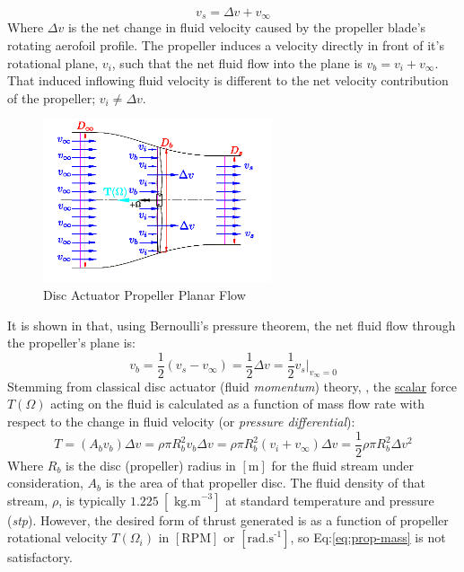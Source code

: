 \begin{equation}
v_s = \Delta v + v_\infty
\end{equation}
Where $\Delta v$ is the net change in fluid velocity caused by the propeller blade's rotating aerofoil profile. The propeller induces a velocity directly in front of it's rotational plane, $v_i$, such that the net fluid flow into the plane is $v_b=v_i+v_\infty$. That induced inflowing fluid velocity is different to the net velocity contribution of the propeller; $v_i\not=\Delta v$.
\par
\begin{figure}[htbp]
\centering
\includegraphics[width=0.6\textwidth]{figs/bem-flow}
\caption{Disc Actuator Propeller Planar Flow}
\label{fig:bem-flow}
\vspace{-15pt}
\end{figure}
It is shown in \cite{bladesforquadrotors} that, using Bernoulli's pressure theorem, the net fluid flow through the propeller's plane is:
\begin{equation}\label{eq:bernoulli}
v_b = \frac{1}{2} ( v_s - v_{\infty} ) = \frac{1}{2} \Delta v = \frac{1}{2} v_s \big|_{v_\infty=0}
\end{equation}
Stemming from classical disc actuator (fluid \emph{momentum}) theory, \cite{fluidmomentum}, the \underline{scalar} force $T(\Omega)$ acting on the fluid is calculated as a function of mass flow rate with respect to the change in fluid velocity (or \emph{pressure differential}):
\begin{equation}\label{eq:prop-mass}
T=(A_b v_b)\Delta v = \rho \pi R_b^2v_b \Delta v = \rho \pi R_b^2(v_i+v_\infty)\Delta v = \frac{1}{2} \rho \pi R_b^2 \Delta v^2
\end{equation}
Where $R_b$ is the disc (propeller) radius in $[\text{m}]$ for the fluid stream under consideration, $A_b$ is the area of that propeller disc. The fluid density of that stream, $\rho$, is typically $1.225~[\text{ kg.m}^{-3}]$ at standard temperature and pressure (\emph{stp}). However, the desired form of thrust generated is as a function of propeller rotational velocity $T(\Omega_i)$ in $[\text{RPM}]$ or $[\text{rad.s}^{\text{-}1}]$, so Eq:\ref{eq:prop-mass} is not satisfactory. 
